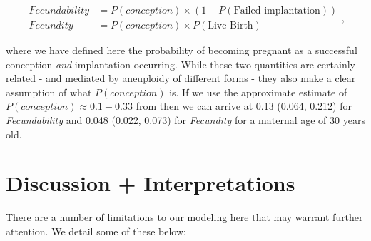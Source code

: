 \documentclass{article}
\begin{document}
\begin{equation}
\begin{aligned}
Fecundability &= P(conception)\times (1 - P(\text{Failed implantation}))\\
Fecundity &= P(conception)\times P(\text{Live Birth})
\end{aligned},
\end{equation}

where we have defined here the probability of becoming pregnant as a successful conception \textit{and} implantation occurring. While these two quantities are certainly related - and mediated by aneuploidy of different forms - they also make a clear assumption of what $P(conception)$ is. If we use the approximate estimate of $P(conception) \approx 0.1 - 0.33$ from \citep{Wilcox1995-hs} then we can arrive at  0.13 (0.064, 0.212) for \textit{Fecundability} and 0.048 (0.022, 0.073) for \textit{Fecundity} for a maternal age of 30 years old.

\section*{Discussion + Interpretations}

There are a number of limitations to our modeling here that may warrant further attention. We detail some of these below: 
\end{document}
